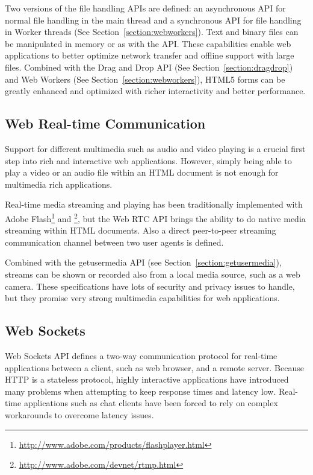 Two versions of the file handling APIs are defined: an asynchronous
API for normal file handling in the main thread and a synchronous API
for file handling in Worker threads (See
Section~\ref{section:webworkers}). Text and binary files can be
manipulated in memory or as   with the
 API. These capabilities enable web applications to better
optimize network transfer and offline support with large
files. Combined with the Drag and Drop API (See
Section~\ref{section:dragdrop}) and Web Workers (See
Section~\ref{section:webworkers}), HTML5 forms can be greatly enhanced
and optimized with richer interactivity and better performance.

\subsection{Web Real-time Communication}

Support for different multimedia such as audio and video playing is a
crucial first step into rich and interactive web
applications. However, simply being able to play a video or an audio
file within an HTML document is not enough for multimedia rich
applications.

Real-time media streaming and playing has been traditionally
implemented with Adobe
Flash\footnote{\url{http://www.adobe.com/products/flashplayer.html}}
and \footnote{\url{http://www.adobe.com/devnet/rtmp.html}},
but the Web RTC API \cite{WebRTC} brings the ability to do native
media streaming within HTML documents. Also a direct peer-to-peer
streaming communication channel between two user agents is defined.

Combined with the getusermedia API \cite{getusermedia} (see
Section~\ref{section:getusermedia}), streams can be shown or recorded
also from a local media source, such as a web camera. These
specifications have lots of security and privacy issues to handle, but
they promise very strong multimedia capabilities for web applications.

\subsection{Web Sockets}

Web Sockets API \cite{WebSockets, WebSocketProtocol} defines a two-way
communication protocol for real-time applications between a client,
such as web browser, and a remote server. Because HTTP is a stateless
protocol, highly interactive applications have introduced many
problems when attempting to keep response times and latency
low. Real-time applications such as chat clients have been forced to
rely on complex workarounds to overcome latency issues.

